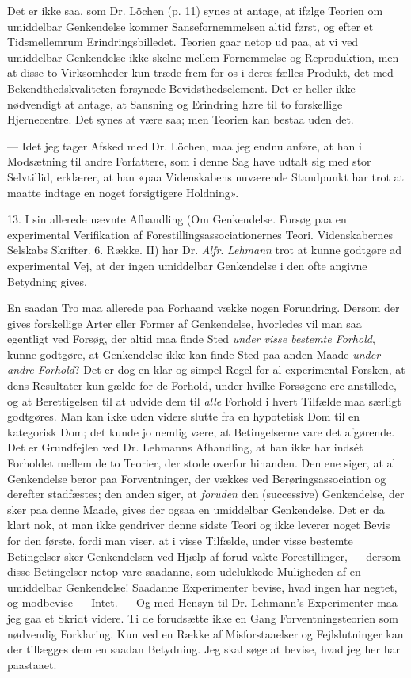 \documentclass[12pt,a4paper,openany]{book}
\newcommand{\opage}[1]{\marginnote{\footnotesize\textit{[#1]}}}
\begin{document}
Det er ikke saa, som Dr. Löchen (p. 11) synes at antage, at ifølge Teorien om
umiddelbar Genkendelse kommer Sansefornemmelsen altid først, og efter et
Tidsmellemrum Erindringsbilledet. Teorien gaar netop ud paa, at vi ved
umiddelbar Genkendelse ikke skelne mellem Fornemmelse og Reproduktion, men at
disse to Virksomheder kun træde frem for os i deres fælles Produkt, det med
Bekendthedskvaliteten forsynede Bevidsthedselement. Det er heller ikke
nødvendigt at antage, at Sansning og Erindring høre til to forskellige
Hjernecentre. Det synes at være saa; men Teorien kan bestaa uden det.

--- Idet jeg tager Afsked med Dr. Löchen, maa jeg endnu anføre, at han i
Modsætning til andre Forfattere, som i denne Sag have udtalt sig med stor
Selvtillid, erklærer, at han «paa Videnskabens nuværende Standpunkt har trot at
maatte indtage en noget forsigtigere Holdning».

13. I sin allerede nævnte Afhandling (Om Genkendelse. Forsøg paa en
experimental Verifikation af Forestillingsassociationernes Teori.
Videnskabernes Selskabs Skrifter. 6. Række. II) har Dr. \emph{Alfr}.
\emph{Lehmann} trot at kunne godtgøre ad experimental Vej, at der ingen
umiddelbar Genkendelse i den ofte angivne Betydning gives.

En saadan Tro maa allerede paa Forhaand vække nogen Forundring. Dersom der
gives forskellige Arter eller Former af Genkendelse, hvorledes vil man saa
egentligt ved Forsøg, der altid maa finde Sted \emph{under visse bestemte
Forhold}, kunne godtgøre, at Genkendelse ikke kan finde Sted paa anden Maade
\emph{under andre Forhold}? Det er dog en klar og simpel Regel for al
experimental Forsken, at dens Resultater kun gælde for
\setcounter{footnote}{0}%
\opage{29}de Forhold, under hvilke Forsøgene ere anstillede, og at
Berettigelsen til at udvide dem til \emph{alle} Forhold i hvert Tilfælde maa
særligt godtgøres. Man kan ikke uden videre slutte fra en hypotetisk Dom til en
kategorisk Dom; det kunde jo nemlig være, at Betingelserne vare det afgørende.
Det er Grundfejlen ved Dr. Lehmanns Afhandling, at han ikke har indsét
Forholdet mellem de to Teorier, der stode overfor hinanden. Den ene siger, at
al Genkendelse beror paa Forventninger, der vækkes ved Berøringsassociation og
derefter stadfæstes; den anden siger, at \emph{foruden} den (successive)
Genkendelse, der sker paa denne Maade, gives der ogsaa en umiddelbar
Genkendelse. Det er da klart nok, at man ikke gendriver denne sidste Teori og
ikke leverer noget Bevis for den første, fordi man viser, at i visse Tilfælde,
under visse bestemte Betingelser sker Genkendelsen ved Hjælp af forud vakte
Forestillinger, --- dersom disse Betingelser netop vare saadanne, som
udelukkede Muligheden af en umiddelbar Genkendelse! Saadanne Experimenter
bevise, hvad ingen har negtet, og modbevise --- Intet. --- Og med Hensyn til
Dr. Lehmann's Experimenter maa jeg gaa et Skridt videre. Ti de forudsætte ikke
en Gang Forventningsteorien som nødvendig Forklaring. Kun ved en Række af
Misforstaaelser og Fejlslutninger kan der tillægges dem en saadan Betydning.
Jeg skal søge at bevise, hvad jeg her har paastaaet.
\end{document}
